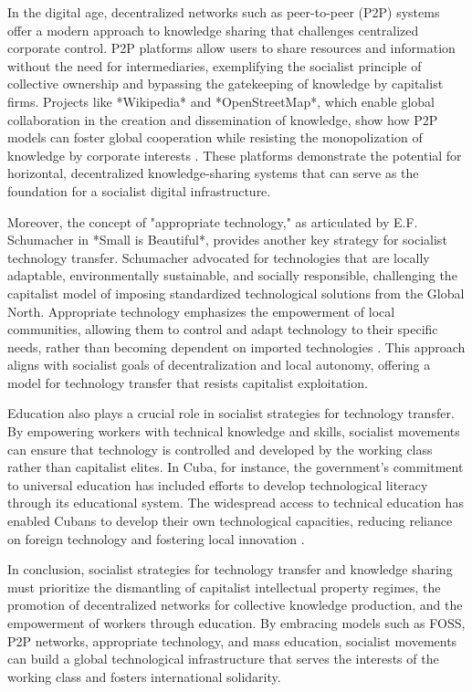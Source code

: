 \begin{refsection}
In the digital age, decentralized networks such as peer-to-peer (P2P) systems offer a modern approach to knowledge sharing that challenges centralized corporate control. P2P platforms allow users to share resources and information without the need for intermediaries, exemplifying the socialist principle of collective ownership and bypassing the gatekeeping of knowledge by capitalist firms. Projects like *Wikipedia* and *OpenStreetMap*, which enable global collaboration in the creation and dissemination of knowledge, show how P2P models can foster global cooperation while resisting the monopolization of knowledge by corporate interests \cite[pp.~29-32]{reagle_wikipedia}. These platforms demonstrate the potential for horizontal, decentralized knowledge-sharing systems that can serve as the foundation for a socialist digital infrastructure.

Moreover, the concept of "appropriate technology," as articulated by E.F. Schumacher in *Small is Beautiful*, provides another key strategy for socialist technology transfer. Schumacher advocated for technologies that are locally adaptable, environmentally sustainable, and socially responsible, challenging the capitalist model of imposing standardized technological solutions from the Global North. Appropriate technology emphasizes the empowerment of local communities, allowing them to control and adapt technology to their specific needs, rather than becoming dependent on imported technologies \cite[pp.~29-35]{schumacher_small}. This approach aligns with socialist goals of decentralization and local autonomy, offering a model for technology transfer that resists capitalist exploitation.

Education also plays a crucial role in socialist strategies for technology transfer. By empowering workers with technical knowledge and skills, socialist movements can ensure that technology is controlled and developed by the working class rather than capitalist elites. In Cuba, for instance, the government’s commitment to universal education has included efforts to develop technological literacy through its educational system. The widespread access to technical education has enabled Cubans to develop their own technological capacities, reducing reliance on foreign technology and fostering local innovation \cite[pp.~215-220]{feinberg_cuba}.

In conclusion, socialist strategies for technology transfer and knowledge sharing must prioritize the dismantling of capitalist intellectual property regimes, the promotion of decentralized networks for collective knowledge production, and the empowerment of workers through education. By embracing models such as FOSS, P2P networks, appropriate technology, and mass education, socialist movements can build a global technological infrastructure that serves the interests of the working class and fosters international solidarity.


\end{refsection}
